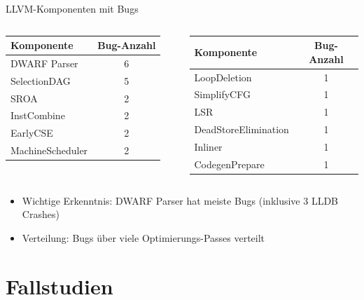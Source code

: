 ﻿\documentclass{beamer}
\begin{document}
\begin{frame}{LLVM-Komponenten mit Bugs}
  \begin{columns}
      \begin{tabular}{|l|c|}
        \hline
        \textbf{Komponente} & \textbf{Bug-Anzahl} \\
        \hline
        DWARF Parser & 6 \\
        \hline
        SelectionDAG & 5 \\
        \hline
        SROA & 2 \\
        \hline
        InstCombine & 2 \\
        \hline
        EarlyCSE & 2 \\
        \hline
        MachineScheduler & 2 \\
        \hline
      \end{tabular}
      \begin{tabular}{|l|c|}
        \hline
        \textbf{Komponente} & \textbf{Bug-Anzahl} \\
        \hline
        LoopDeletion & 1 \\
        \hline
        SimplifyCFG & 1 \\
        \hline
        LSR & 1 \\
        \hline
        DeadStoreElimination & 1 \\
        \hline
        Inliner & 1 \\
        \hline
        CodegenPrepare & 1 \\
        \hline
      \end{tabular}
  \end{columns}
  \vspace{0.3cm}
  \begin{itemize}
    \item Wichtige Erkenntnis: DWARF Parser hat meiste Bugs (inklusive 3 LLDB Crashes)
    \item Verteilung: Bugs \"uber viele Optimierungs-Passes verteilt
  \end{itemize}
\end{frame}

\section{Fallstudien}
\end{document}
